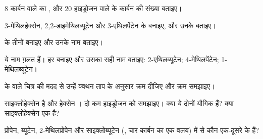 \begin{exercise}[$\star$]\label{exo:g11:organic-skeletons:5}
8 कार्बन  वाले  का , और 20 हाइड्रोजन  वाले
 के कार्बन  की संख्या बताइए।
\end{exercise}

\begin{exercise}[$\star\star$]\label{exo:g11:organic-skeletons:6}
3-मेथिलहेक्सेन, 2,2-डाइमेथिलब्यूटेन और 3-एथिलपेंटेन के 
बनाइए, और उनके  बताइए।
\end{exercise}

\begin{exercise}[$\star\star$]\label{exo:g11:organic-skeletons:7}
 के तीनों  बनाइए और उनके नाम बताइए।
\end{exercise}

\begin{exercise}[$\star\star$]\label{exo:g11:organic-skeletons:8}
ये नाम ग़लत हैं। हर  बनाइए और उसका सही नाम बताइए:
2-एथिलब्यूटेन; 4-मेथिलपेंटेन; 1-मेथिलब्यूटेन।
\end{exercise}

\begin{exercise}[$\star\star$]\label{exo:g11:organic-skeletons:9}
 के  वाले चित्र की मदद से उन्हें क्वथन ताप के अनुसार क्रम
दीजिए और क्रम समझाइए।
\end{exercise}

\begin{exercise}[$\star\star$]\label{exo:g11:organic-skeletons:10}
साइक्लोहेक्सेन  है और हेक्सेन । दो कम हाइड्रोजन 
को समझाइए। क्या ये दोनों यौगिक  हैं? क्या साइक्लोहेक्सेन एक
 है?
\end{exercise}

\begin{exercise}[$\star\star$]\label{exo:g11:organic-skeletons:11}
प्रोपेन, ब्यूटेन, 2-मेथिलप्रोपेन और साइक्लोब्यूटेन (, चार कार्बन 
का एक वलय) में से कौन एक-दूसरे के  हैं?
\end{exercise}

